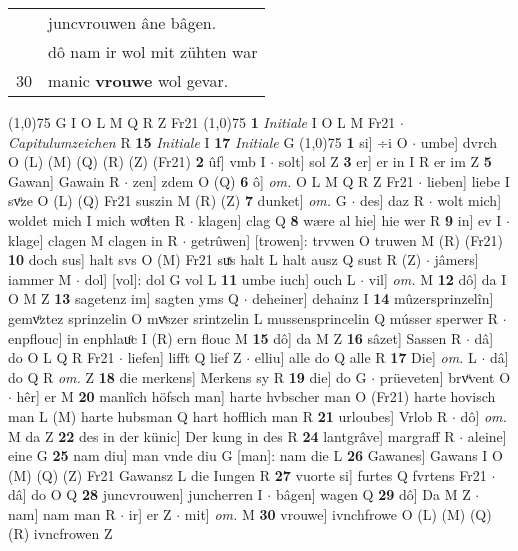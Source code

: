 \documentclass[8pt,a4paper,notitlepage]{article}
\begin{document}
\begin{table}[ht]
\begin{minipage}[t]{0.5\linewidth}
\begin{tabular}{rl}
 & juncvrouwen âne bâgen.\\ 
 & dô nam ir wol mit zühten war\\ 
30 & manic \textbf{vrouwe} wol gevar.\\ 
\end{tabular}
\scriptsize
\line(1,0){75} \newline
G I O L M Q R Z Fr21 \newline
\line(1,0){75} \newline
\textbf{1} \textit{Initiale} I O L M Fr21   $\cdot$ \textit{Capitulumzeichen} R  \textbf{15} \textit{Initiale} I  \textbf{17} \textit{Initiale} G  \newline
\line(1,0){75} \newline
\textbf{1} si] ÷i O  $\cdot$ umbe] dvrch O (L) (M) (Q) (R) (Z) (Fr21) \textbf{2} ûf] vmb I  $\cdot$ solt] sol Z \textbf{3} er] er in I R er im Z \textbf{5} Gawan] Gawain R  $\cdot$ zen] zdem O (Q) \textbf{6} ô] \textit{om.} O L M Q R Z Fr21  $\cdot$ lieben] liebe I svͦze O (L) (Q) Fr21 suszin M (R) (Z) \textbf{7} dunket] \textit{om.} G  $\cdot$ des] daz R  $\cdot$ wolt mich] woldet mich I mich woͯlten R  $\cdot$ klagen] clag Q \textbf{8} wære al hie] hie wer R \textbf{9} in] ev I  $\cdot$ klage] clagen M clagen in R  $\cdot$ getrûwen] [trowen]: trvwen O truwen M (R) (Fr21) \textbf{10} doch sus] halt svs O (M) Fr21 suͯs halt L halt ausz Q sust R (Z)  $\cdot$ jâmers] iammer M  $\cdot$ dol] [vol]: dol G vol L \textbf{11} umbe iuch] ouch L  $\cdot$ vil] \textit{om.} M \textbf{12} dô] da I O M Z \textbf{13} sagetenz im] sagten yms Q  $\cdot$ deheiner] dehainz I \textbf{14} mûzersprinzelîn] gemvͦztez sprinzelin O mvͯszer srintzelin L mussensprincelin Q músser sperwer R  $\cdot$ enpflouc] in enphlauͦc I (R) ern flouc M \textbf{15} dô] da M Z \textbf{16} sâzet] Sassen R  $\cdot$ dâ] do O L Q R Fr21  $\cdot$ liefen] lifft Q lief Z  $\cdot$ elliu] alle do Q alle R \textbf{17} Die] \textit{om.} L  $\cdot$ dâ] do Q R \textit{om.} Z \textbf{18} die merkens] Merkens sy R \textbf{19} die] do G  $\cdot$ prüeveten] brvͦvent O  $\cdot$ hêr] er M \textbf{20} manlîch höfsch man] harte hvbscher man O (Fr21) harte hovisch man L (M) harte hubsman Q hart hofflich man R \textbf{21} urloubes] Vrlob R  $\cdot$ dô] \textit{om.} M da Z \textbf{22} des in der künic] Der kung in des R \textbf{24} lantgrâve] margraff R  $\cdot$ aleine] eine G \textbf{25} nam diu] man vnde diu G [man]: nam die L \textbf{26} Gawanes] Gawans I O (M) (Q) (Z) Fr21 Gawansz L die Iungen R \textbf{27} vuorte si] furtes Q fvrtens Fr21  $\cdot$ dâ] do O Q \textbf{28} juncvrouwen] juncherren I  $\cdot$ bâgen] wagen Q \textbf{29} dô] Da M Z  $\cdot$ nam] nam man R  $\cdot$ ir] er Z  $\cdot$ mit] \textit{om.} M \textbf{30} vrouwe] ivnchfrowe O (L) (M) (Q) (R) ivncfrowen Z \newline

\end{minipage}
\end{table}
\end{document}
